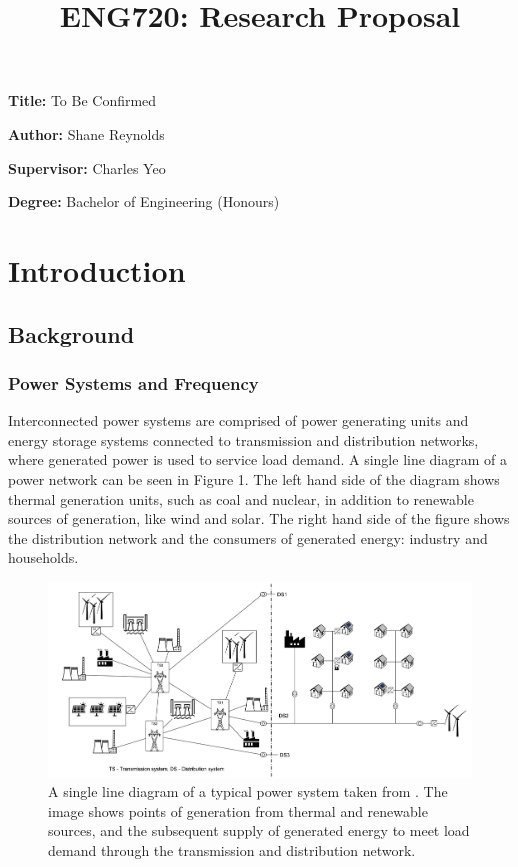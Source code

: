 \documentclass[12pt, a4paper]{article}
\title{ENG720: Research Proposal}
\author{}
\date{}
\newcommand{\namelistlabel}[1]{\mbox{#1}\hfil}
\newenvironment{namelist}[1]{%
\begin{list}{}
    {
        \let\makelabel\namelistlabel
        \settowidth{\labelwidth}{#1}
        \setlength{\leftmargin}{1.1\labelwidth}
    }
  }{%
\end{list}}
\begin{document}
\maketitle

\begin{namelist}{xxxxxxxxxxxx}
\item[{\bf Title:}]
	To Be Confirmed
\item[{\bf Author:}]
	Shane Reynolds
\item[{\bf Supervisor:}]
	Charles Yeo
\item[{\bf Degree:}]
	Bachelor of Engineering (Honours)
\end{namelist}


\tableofcontents
\newpage

\section{Introduction}
\subsection{Background}

\subsubsection{Power Systems and Frequency}
Interconnected power systems are comprised of power generating units and energy storage systems connected to transmission and distribution networks, where generated power is used to service load demand. A single line diagram of a power network can be seen in Figure 1. The left hand side of the diagram shows thermal generation units, such as coal and nuclear, in addition to renewable sources of generation, like wind and solar. The right hand side of the figure shows the distribution network and the consumers of generated energy: industry and households.
\begin{figure}[h]
	\centering
	\includegraphics[scale=0.85]{power_system}
	\caption{A single line diagram of a typical power system taken from \cite{Glavic2019}. The image shows points of generation from thermal and renewable sources, and the subsequent supply of generated energy to meet load demand through the transmission and distribution network.}
\end{figure}
\end{document}
